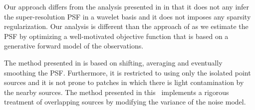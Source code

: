 Our approach differs from the analysis presented in \citet{ngole,ngole2} in that it does not any infer the super-resolution PSF in a wavelet basis and it does not 
imposes any sparsity regularization. Our analysis is different than the approach of \citet{anderson2000} as we estimate the PSF by optimizing a well-motivated objective function 
that is based on a generative forward model of the observations. 

The method presented in \citet{anderson2000} is based on shifting, averaging and eventually smoothing the PSF.
Furthermore, it is restricted to using only the isolated point sources and it is not prone to patches in which there is light contamination by the nearby sources. 
The method presented in this \paper\ implements a rigorous treatment of overlapping sources by modifying the variance of the noise model. 





